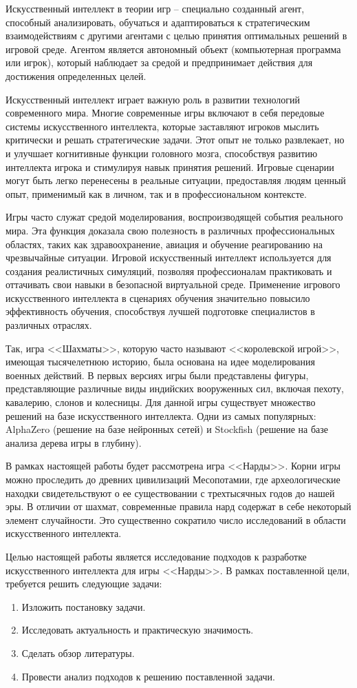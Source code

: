 Искусственный интеллект в теории игр -- специально созданный агент, способный анализировать, обучаться и адаптироваться к стратегическим взаимодействиям с другими агентами с целью принятия оптимальных решений в игровой среде. Агентом является автономный объект (компьютерная программа или игрок), который наблюдает за средой и предпринимает действия для достижения определенных целей.

Искусственный интеллект играет важную роль в развитии технологий современного мира. Многие современные игры включают в себя передовые системы искусственного интеллекта, которые заставляют игроков мыслить критически и решать стратегические задачи. Этот опыт не только развлекает, но и улучшает когнитивные функции головного мозга, способствуя развитию интеллекта игрока и стимулируя навык принятия решений. Игровые сценарии могут быть легко перенесены в реальные ситуации, предоставляя людям ценный опыт, применимый как в личном, так и в профессиональном контексте.

Игры часто служат средой моделирования, воспроизводящей события реального мира. Эта функция доказала свою полезность в различных профессиональных областях, таких как здравоохранение, авиация и обучение реагированию на чрезвычайные ситуации. Игровой искусственный интеллект используется для создания реалистичных симуляций, позволяя профессионалам практиковать и оттачивать свои навыки в безопасной виртуальной среде. Применение игрового искусственного интеллекта в сценариях обучения значительно повысило эффективность обучения, способствуя лучшей подготовке специалистов в различных отраслях.

Так, игра <<Шахматы>>, которую часто называют <<королевской игрой>>, имеющая тысячелетнюю историю, была основана на идее моделирования военных действий. В первых версиях игры были представлены фигуры, представляющие различные виды индийских вооруженных сил, включая пехоту, кавалерию, слонов и колесницы. Для данной игры существует множество решений на базе искусственного интеллекта. Одни из самых популярных: AlphaZero (решение на базе нейронных сетей) и Stockfish (решение на базе анализа дерева игры в глубину).

В рамках настоящей работы будет рассмотрена игра <<Нарды>>. Корни игры можно проследить до древних цивилизаций Месопотамии, где археологические находки свидетельствуют о ее существовании с трехтысячных годов до нашей эры. В отличии от шахмат, современные правила нард содержат в себе некоторый элемент случайности. Это существенно сократило число исследований в области искусственного интеллекта.

Целью настоящей работы является исследование подходов к разработке искусственного интеллекта для игры <<Нарды>>. В рамках поставленной цели, требуется решить следующие задачи:
\begin{enumerate}
\item Изложить постановку задачи.
\item Исследовать актуальность и практическую значимость.
\item Сделать обзор литературы.
\item Провести анализ подходов к решению поставленной задачи.
\end{enumerate}

